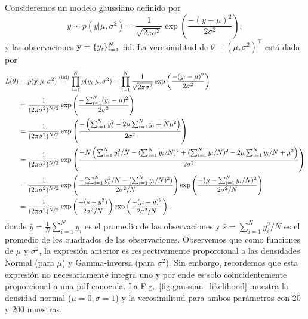 \begin{mdframed}[style=ejemplo, frametitle={\center Ejemplo: Verosimilitud para el modelo gaussiano  (muestras  independientes)}]

Consideremos un  modelo gaussiano definido por 
\begin{equation}
	y \sim p(y|\mu,\sigma^2) = \frac{1}{\sqrt{2\pi\sigma^2}}\exp\left(\frac{-(y-\mu)^2}{2\sigma^2}\right), \label{eq:ejemplo_gaussiano}
\end{equation}
y las observaciones $\mathbf{y} = \{y_i\}_{i=1}^N$ iid. La verosimilitud  de $\theta  =  (\mu,\sigma^2)^\top$ está dada por 
\begin{align}
  	L(\theta)  &=  p(\mathbf{y}|\mu,\sigma^2) \stackrel{\text{(iid)}}{=}\prod_{i=1}^N p(y_i|\mu,\sigma^2) = \prod_{i=1}^N \frac{1}{\sqrt{2\pi\sigma^2}}\exp\left(\frac{-(y_i-\mu)^2}{2\sigma^2}\right)\nonumber\\ 
  				 &= \frac{1}{(2\pi\sigma^2)^{N/2}}  \exp\left(\frac{-\sum_{i=1}^N(y_i-\mu)^2}{2\sigma^2}\right)\nonumber\\
  				  & = \frac{1}{(2\pi\sigma^2)^{N/2}} \exp\left(\frac{-\left(\sum_{i=1}^Ny_i^2 - 2\mu\sum_{i=1}^Ny_i + N\mu^2\right)}{2\sigma^2}\right)\nonumber\\
  				  & = \frac{1}{(2\pi\sigma^2)^{N/2}}  \exp\left(\frac{-N\left(\sum_{i=1}^Ny_i^2/N -(\sum_{i=1}^Ny_i/N)^2 +(\sum_{i=1}^Ny_i/N)^2- 2\mu\sum_{i=1}^Ny_i/N + \mu^2\right)}{2\sigma^2}\right)\nonumber\\
  				  & = \frac{1}{(2\pi\sigma^2)^{N/2}}  \exp\left(\frac{-(\sum_{i=1}^Ny_i^2/N  - (\sum_{i=1}^Ny_i/N)^2)}{2\sigma^2/N}\right)\exp\left(\frac{-(\mu - \sum_{i=1}^Ny_i/N)^2}{2\sigma^2/N}\right)
  				\nonumber\\
  				  & = \frac{1}{(2\pi\sigma^2)^{N/2}}  \exp\left(\frac{-(\bar s  - \bar y^2)}{2\sigma^2/N}\right)\exp\left(\frac{-(\mu - \bar y)^2}{2\sigma^2/N}\right)
  				\nonumber,
  \end{align}  
  donde $\bar y = \tfrac{1}{N}\sum_{i=1}^Ny_i$ es el promedio de las observaciones y $\bar s = \sum_ {i=1}^Ny_i^2/N$ es el promedio de los cuadrados de las observaciones. Observemos que como funciones de $\mu$ y $\sigma^2$, la expresión anterior es respectivamente  proporcional a las densidades Normal (para $\mu$) y Gamma-inversa (para $\sigma^2$). Sin embargo, recordemos que esta  expresión no necesariamente integra uno y por  ende es solo coincidentemente proporcional a una pdf conocida. La Fig.~\ref{fig:gaussian_likelihood} muestra la  densidad normal ($\mu=0,\sigma=1$) y la verosimilitud para ambos parámetros con 20 y 200 muestras. 


\end{mdframed}
